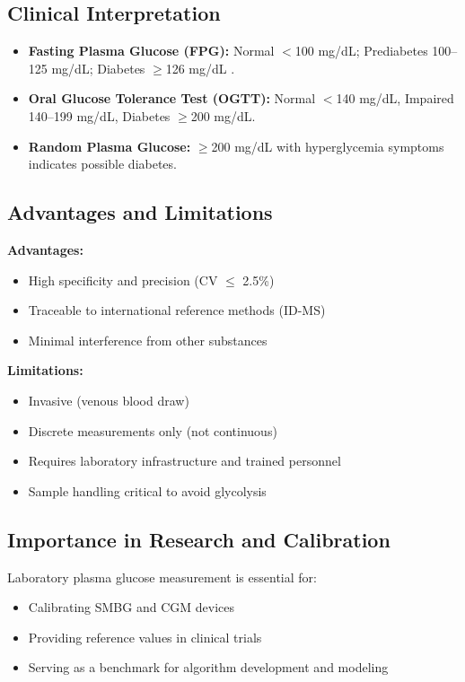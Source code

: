 \documentclass[12pt,a4paper]{article}  %
\begin{document}
\subsection{Clinical Interpretation}
\begin{itemize}
    \item \textbf{Fasting Plasma Glucose (FPG):} Normal $<$100 mg/dL; Prediabetes 100--125 mg/dL; Diabetes $\geq$126 mg/dL \cite{StatPearls2025}.
    \item \textbf{Oral Glucose Tolerance Test (OGTT):} Normal $<$140 mg/dL, Impaired 140--199 mg/dL, Diabetes $\geq$200 mg/dL.
    \item \textbf{Random Plasma Glucose:} $\geq$200 mg/dL with hyperglycemia symptoms indicates possible diabetes.
\end{itemize}

\subsection{Advantages and Limitations}
\textbf{Advantages:}
\begin{itemize}
    \item High specificity and precision (CV $\leq$ 2.5\%)
    \item Traceable to international reference methods (ID-MS)
    \item Minimal interference from other substances
\end{itemize}

\textbf{Limitations:}
\begin{itemize}
    \item Invasive (venous blood draw)
    \item Discrete measurements only (not continuous)
    \item Requires laboratory infrastructure and trained personnel
    \item Sample handling critical to avoid glycolysis
\end{itemize}

\subsection{Importance in Research and Calibration}
Laboratory plasma glucose measurement is essential for:
\begin{itemize}
    \item Calibrating SMBG and CGM devices
    \item Providing reference values in clinical trials
    \item Serving as a benchmark for algorithm development and modeling
\end{itemize}
\end{document}
